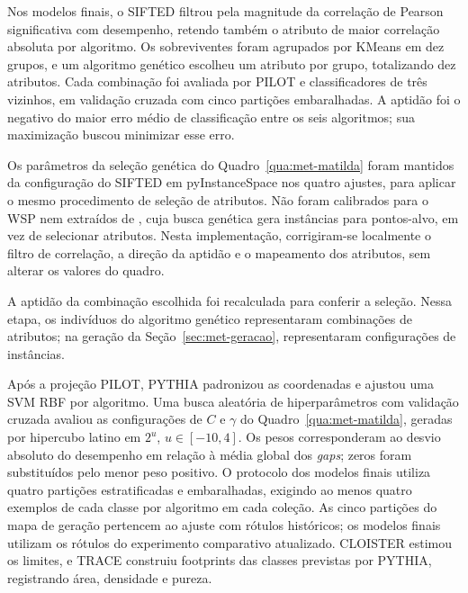 Nos modelos finais, o SIFTED filtrou pela magnitude da correlação de
Pearson significativa com desempenho, retendo também o atributo de maior
correlação absoluta por algoritmo. Os sobreviventes foram
agrupados por KMeans em dez grupos, e um algoritmo genético escolheu
um atributo por grupo, totalizando dez atributos. Cada combinação foi avaliada por PILOT e classificadores de
três vizinhos, em validação cruzada com cinco partições embaralhadas.
A aptidão foi o negativo do maior erro médio de classificação entre os
seis algoritmos; sua maximização buscou minimizar esse erro.

\newpage
Os parâmetros da seleção genética do Quadro~\ref{qua:met-matilda} foram
mantidos da configuração do SIFTED em pyInstanceSpace
\cite{PyInstanceSpace021} nos quatro ajustes, para aplicar o mesmo
procedimento de seleção de atributos. Não foram calibrados para o WSP nem
extraídos de , cuja busca genética gera
instâncias para pontos-alvo, em vez de selecionar atributos. Nesta
implementação, corrigiram-se localmente o filtro de correlação, a direção
da aptidão e o mapeamento dos atributos, sem alterar os valores do quadro.

A aptidão da combinação escolhida foi recalculada para conferir a seleção.
Nessa etapa, os indivíduos do algoritmo genético representaram combinações
de atributos; na geração da Seção~\ref{sec:met-geracao}, representaram
configurações de instâncias.

Após a projeção PILOT, PYTHIA padronizou as coordenadas e ajustou uma
SVM RBF por algoritmo. Uma busca aleatória de hiperparâmetros com
validação cruzada avaliou as configurações
de $C$ e $\gamma$ do Quadro~\ref{qua:met-matilda}, geradas por hipercubo
latino em $2^u$, $u\in[-10,4]$.
Os pesos corresponderam ao desvio absoluto
do desempenho em relação à média global dos \textit{gaps}; zeros foram substituídos
pelo menor peso positivo. O protocolo dos modelos finais utiliza quatro
partições estratificadas e embaralhadas, exigindo ao menos quatro exemplos
de cada classe por algoritmo em cada coleção. As cinco partições do mapa
de geração pertencem ao ajuste com rótulos históricos; os modelos finais
utilizam os rótulos do experimento comparativo atualizado.
CLOISTER estimou os limites, e TRACE construiu footprints das classes
previstas por PYTHIA, registrando área, densidade e pureza.

